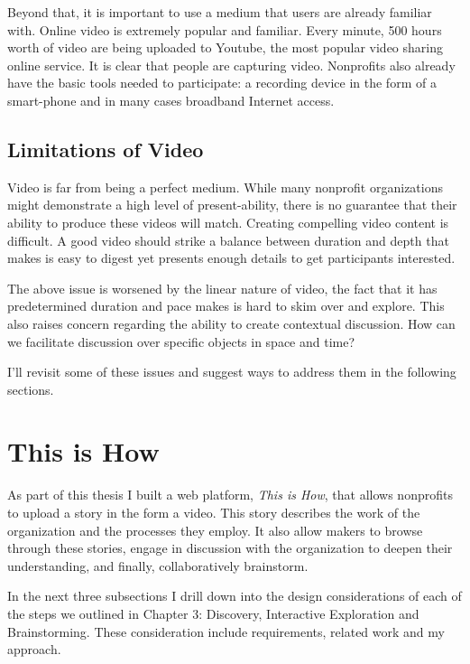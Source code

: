 
Beyond that, it is important to use a medium that users are already familiar with. Online video is extremely popular and familiar. Every minute, 500 hours worth of video are being uploaded to Youtube\cite{youtubestats}, the most popular video sharing online service. It is clear that people are capturing video. Nonprofits also already have the basic tools needed to participate: a recording device in the form of a smart-phone and in many cases broadband Internet access. 

\subsection{Limitations of Video} 

Video is far from being a perfect medium. While many nonprofit organizations might demonstrate a high level of present-ability, there is no guarantee that their ability to produce these videos will match. Creating compelling video content is difficult. A good video should strike a balance between duration and depth that makes is easy to digest yet presents enough details to get participants interested. 

The above issue is worsened by the linear nature of video, the fact that it has predetermined duration and pace makes is hard to skim over and explore. This also raises concern regarding the ability to create contextual discussion. How can we facilitate discussion over specific objects in space and time?

I'll revisit some of these issues and suggest ways to address them in the following sections.

\section{This is How}

As part of this thesis I built a web platform, \textit{This is How}, that allows nonprofits to upload a story in the form a video. This story describes the work of the organization and the processes they employ. It also allow makers to browse through these stories, engage in discussion with the organization to deepen their understanding, and finally, collaboratively brainstorm. 

In the next three subsections I drill down into the design considerations of each of the steps we outlined in Chapter 3: Discovery, Interactive Exploration and Brainstorming. These consideration include requirements, related work and my approach. 

